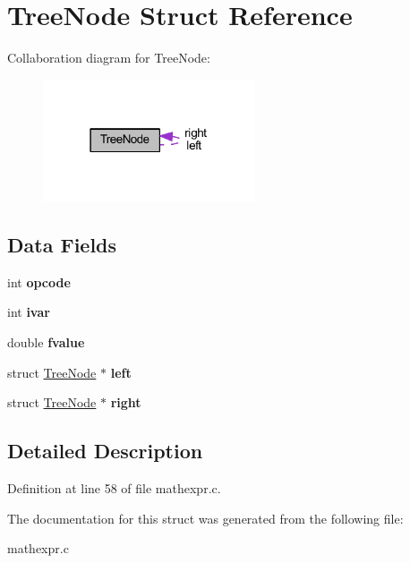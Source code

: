 \hypertarget{struct_tree_node}{}\section{Tree\+Node Struct Reference}
\label{struct_tree_node}


Collaboration diagram for Tree\+Node\+:
\nopagebreak
\begin{figure}[H]
\begin{center}
\leavevmode
\includegraphics[width=178pt]{db/dff/struct_tree_node__coll__graph}
\end{center}
\end{figure}
\subsection*{Data Fields}
\begin{DoxyCompactItemize}
\item 
\mbox{\label{struct_tree_node_aff3af4fae5174de7c7e40ec004999ca0}} 
int {\bfseries opcode}
\item 
\mbox{\label{struct_tree_node_adc87312468a7b326c477331e96e12a7a}} 
int {\bfseries ivar}
\item 
\mbox{\label{struct_tree_node_a40dfd136bc3109757a5dcc034cab2006}} 
double {\bfseries fvalue}
\item 
\mbox{\label{struct_tree_node_a99fb5e0be96ed75527d53c3747f93c2d}} 
struct \hyperlink{struct_tree_node}{Tree\+Node} $\ast$ {\bfseries left}
\item 
\mbox{\label{struct_tree_node_a02b3bbe1406cbe1e9f0bc9cc1d5ea247}} 
struct \hyperlink{struct_tree_node}{Tree\+Node} $\ast$ {\bfseries right}
\end{DoxyCompactItemize}


\subsection{Detailed Description}


Definition at line 58 of file mathexpr.\+c.



The documentation for this struct was generated from the following file\+:\begin{DoxyCompactItemize}
\item 
mathexpr.\+c\end{DoxyCompactItemize}
